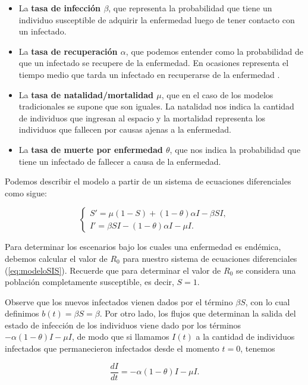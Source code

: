 \begin{itemize}
    \item La \textbf{tasa de infección $\beta$}, que representa la probabilidad que tiene un individuo susceptible de adquirir la enfermedad luego de tener contacto con un infectado.
    \item La \textbf{tasa de recuperación $\alpha$}, que podemos entender como la probabilidad de que un infectado se recupere de la enfermedad. En ocasiones representa el tiempo medio que tarda un infectado en recuperarse de la enfermedad \cite{diego2010}.
    \item La \textbf{tasa de natalidad/mortalidad $\mu$}, que en el caso de los modelos tradicionales se supone que son iguales. La natalidad nos indica la cantidad de individuos que ingresan al espacio y la mortalidad representa los individuos que fallecen por causas ajenas a la enfermedad.
    \item La \textbf{tasa de muerte por enfermedad $\theta$}, que nos indica la probabilidad que tiene un infectado de fallecer a causa de la enfermedad.
\end{itemize}

Podemos describir el modelo a partir de un sistema de ecuaciones diferenciales como sigue:

\begin{equation}\label{eq:modeloSIS}
\left\{
\begin{array}{l}
S' = \mu(1 - S) + (1 - \theta)\alpha I - \beta S I, \\
I' = \beta S I - (1 - \theta)\alpha I - \mu I.
\end{array}
\right.
\end{equation}

Para determinar los escenarios bajo los cuales una enfermedad es endémica, debemos calcular el valor de $R_0$ para nuestro sistema de ecuaciones diferenciales (\ref{eq:modeloSIS}). Recuerde que para determinar el valor de $R_0$ se considera una población completamente susceptible, es decir, $S=1$.

Observe que los nuevos infectados vienen dados por el término $\beta S$, con lo cual definimos $b(t) = \beta S = \beta$. Por otro lado, los flujos que determinan la salida del estado de infección de los individuos viene dado por los términos $-\alpha(1-\theta)I-\mu I$, de modo que si llamamos $I(t)$ a la cantidad de individuos infectados que permanecieron infectados desde el momento $t=0$, tenemos

\begin{equation}\label{eq:Cambio en I}
\frac{dI}{dt} = -\alpha(1-\theta)I-\mu I.
\end{equation}

